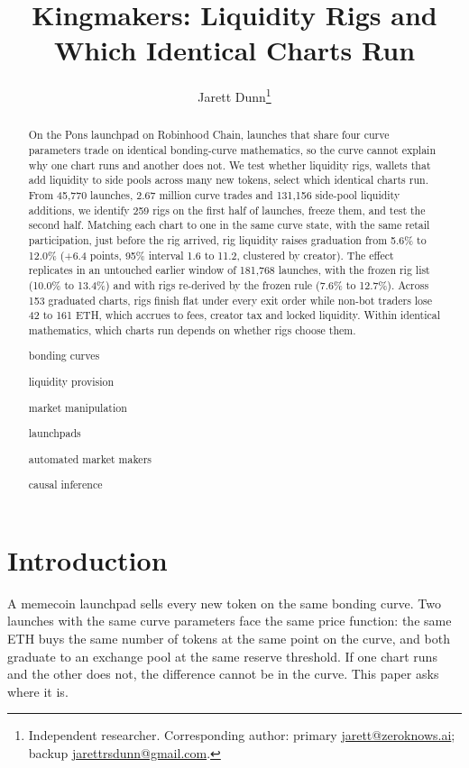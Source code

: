 \documentclass{ledger}
\title{Kingmakers: Liquidity Rigs and Which Identical Charts Run}
\author{Jarett Dunn\thanks{Independent researcher. Corresponding author: primary \href{mailto:jarett@zeroknows.ai}{jarett@zeroknows.ai}; backup \href{mailto:jarettrsdunn@gmail.com}{jarettrsdunn@gmail.com}.}}
\begin{document}
\maketitle
\thispagestyle{pagefirst}
\begin{abstract}
On the Pons launchpad on Robinhood Chain, launches that share four curve parameters trade on identical bonding-curve mathematics, so the curve cannot explain why one chart runs and another does not. We test whether liquidity rigs, wallets that add liquidity to side pools across many new tokens, select which identical charts run. From 45,770 launches, 2.67 million curve trades and 131,156 side-pool liquidity additions, we identify 259 rigs on the first half of launches, freeze them, and test the second half. Matching each chart to one in the same curve state, with the same retail participation, just before the rig arrived, rig liquidity raises graduation from 5.6\% to 12.0\% (+6.4 points, 95\% interval 1.6 to 11.2, clustered by creator). The effect replicates in an untouched earlier window of 181,768 launches, with the frozen rig list (10.0\% to 13.4\%) and with rigs re-derived by the frozen rule (7.6\% to 12.7\%). Across 153 graduated charts, rigs finish flat under every exit order while non-bot traders lose 42 to 161 ETH, which accrues to fees, creator tax and locked liquidity. Within identical mathematics, which charts run depends on whether rigs choose them.
\begin{keywords}
\item bonding curves
\item liquidity provision
\item market manipulation
\item launchpads
\item automated market makers
\item causal inference
\end{keywords}
\end{abstract}

\section{Introduction}\label{introduction}

A memecoin launchpad sells every new token on the same bonding curve. Two launches with the same curve parameters face the same price function: the same ETH buys the same number of tokens at the same point on the curve, and both graduate to an exchange pool at the same reserve threshold. If one chart runs and the other does not, the difference cannot be in the curve. This paper asks where it is.
\end{document}
